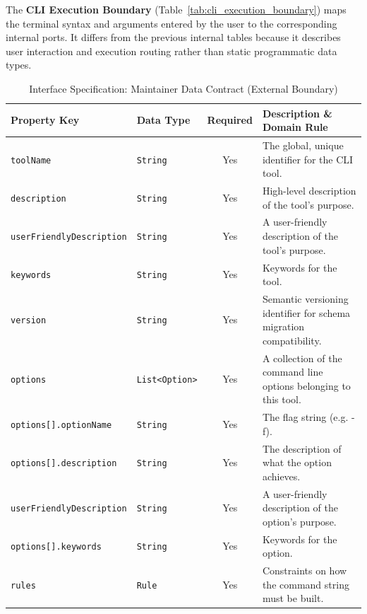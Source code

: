The \textbf{CLI Execution Boundary} (Table~\ref{tab:cli_execution_boundary}) maps the  terminal syntax and arguments entered by the user to the corresponding internal ports. It differs from the previous internal tables because it describes user interaction and execution routing rather than static programmatic data types. 

\begin{table}[H]
    \centering
    \caption{Interface Specification: Maintainer Data Contract (External Boundary)}
    \label{tab:maintainer_data_contract}
    \renewcommand{\arraystretch}{1.4}
    \begin{tabularx}{\textwidth}{|l|l|c|X|}
        \hline
        \rowcolor{gray!10}
        \textbf{Property Key} & \textbf{Data Type} & \textbf{Required} & \textbf{Description \& Domain Rule} \\
        \hline
        \texttt{toolName} & \texttt{String} & Yes & The global, unique identifier for the \ac{CLI} tool. \\
        \hline
        \texttt{description} & \texttt{String} & Yes & High-level description of the tool's purpose. \\
        \hline
        \texttt{userFriendlyDescription} & \texttt{String} & Yes & A user-friendly description of the tool's purpose. \\
        \hline
        \texttt{keywords} & \texttt{String} & Yes & Keywords for the tool. \\
        \hline
        \texttt{version} & \texttt{String} & Yes & Semantic versioning identifier for schema migration compatibility. \\
        \hline
        \texttt{options} & \texttt{List<Option>} & Yes & A collection of the command line options belonging to this tool. \\
        \hline
        \texttt{options[].optionName} & \texttt{String} & Yes & The flag string (e.g. -f). \\
        \hline
        \texttt{options[].description} & \texttt{String} & Yes & The description of what the option achieves. \\
        \hline
        \texttt{userFriendlyDescription} & \texttt{String} & Yes & A user-friendly description of the option's purpose. \\
        \hline
        \texttt{options[].keywords} & \texttt{String} & Yes & Keywords for the option. \\
        \hline
        \texttt{rules} & \texttt{Rule} & Yes & Constraints on how the command string must be built. \\
        \hline
    \end{tabularx}
\end{table}
\FloatBarrier


